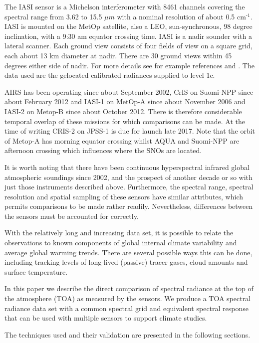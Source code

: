 \documentclass[11pt]{article}
\begin{document}
The IASI sensor is a Michelson interferometer with 8461 channels covering the spectral range from 3.62 to 15.5 \(\mu m\) with a nominal resolution of about 0.5 cm\(^{\text{-1}}\). IASI is mounted on the MetOp satellite, also a LEO, sun-synchronous, 98 degree inclination, with a 9:30 am equator crossing time. IASI is a nadir sounder with a lateral scanner. Each ground view consists of four fields of view on a square grid, each about 13 km diameter at nadir. There are 30 ground views within 45 degrees either side of nadir. For more details see for example references \cite{iasiweb} and \cite{iasiover}. The data used are the gelocated calibrated radiances supplied to level 1c.

AIRS has been operating since about September 2002, CrIS on Suomi-NPP since about February 2012 and IASI-1 on MetOp-A since about November 2006 and IASI-2 on Metop-B since about October 2012. There is therefore considerable temporal overlap of these missions for which comparisons can be made. At the time of writing CRIS-2 on JPSS-1 is due for launch late 2017. Note that the orbit of Metop-A has morning equator crossing whilst AQUA and Suomi-NPP are afternoon crossing which influences where the SNOs are located.

It is worth noting that there have been continuous hyperspectral infrared global atmospheric soundings since 2002, and the prospect of another decade or so with just those instruments described above. Furthermore, the spectral range, spectral resolution and spatial sampling of these sensors have similar attributes, which permits comparisons to be made rather readily. Nevertheless, differences between the sensors must be accounted for correctly.

With the relatively long and increasing data set, it is possible to relate the  observations to known components of global internal climate variability and average global warming trends. There are several possible ways this can be done, including tracking levels of long-lived (passive) tracer gases, cloud amounts and surface temperature. 

In this paper we describe the direct comparison of spectral radiance at the top of the atmosphere (TOA) as measured by the sensors. We produce a TOA spectral radiance data set with a common spectral grid and equivalent spectral response that can be used with multiple sensors to support climate studies.

The techniques used and their validation are presented in the following sections.  
\end{document}
